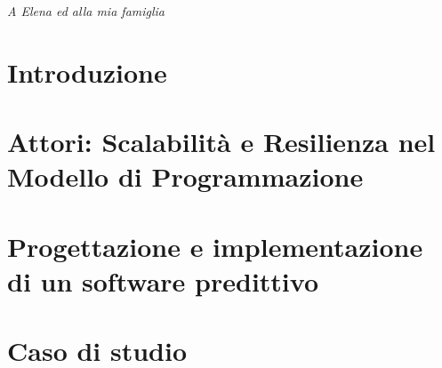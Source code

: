 \documentclass[a4paper, twoside]{book}
\begin{document}
    

    \thispagestyle{empty}
    \cleardoublepage

    \thispagestyle{empty}
    \null{}
        \begin{flushright}
            \textit{A Elena ed alla mia famiglia}
        \end{flushright}
    \null

    

    \tableofcontents
    \listoffigures

    \chapter{Introduzione}
    

    \chapter[Programmazione ad Attori]{Attori: Scalabilità e Resilienza nel Modello di Programmazione}
    

    \chapter[Pipeline predittiva]{Progettazione e implementazione di un software predittivo}
    

    \chapter[Caso di studio]{Caso di studio}
    

    

    \newpage
    \printbibliography
\end{document}

